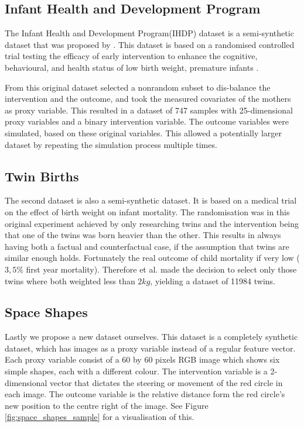 \documentclass{report}
\begin{document}
\subsection{Infant Health and Development Program}
The Infant Health and Development Program(IHDP) dataset is a semi-synthetic dataset that was proposed by \cite{hill2011bayesian}. This dataset is based on a randomised controlled trial testing the efficacy of early intervention to enhance the cognitive, behavioural, and health status of low birth weight, premature infants \cite{ramey1992infant}. 

From this original dataset \cite{hill2011bayesian} selected a nonrandom subset to dis-balance the intervention and the outcome, and took the measured covariates of the mothers as proxy variable. This resulted in a dataset of 747 samples with 25-dimensional proxy variables and a binary intervention variable. The outcome variables were simulated, based on these original variables. This allowed a potentially larger dataset by repeating the simulation process multiple times.

\subsection{Twin Births}
The second dataset is also a semi-synthetic dataset. It is based on a medical trial on the effect of birth weight on infant mortality\cite{almond2005costs}. The randomisation was in this original experiment achieved by only researching twins and the intervention being that one of the twins was born heavier than the other. This results in always having both a factual and counterfactual case, if the assumption that twins are similar enough holds. Fortunately the real outcome of child mortality if very low ($3,5\%$ first year mortality). Therefore \cite{louizos2017causal} et al. made the decision to select only those twins where both weighted less than $2kg$, yielding a dataset of 11984 twins.

\subsection{Space Shapes}
Lastly we propose a new dataset ourselves. This dataset is a completely synthetic dataset, which has images as a proxy variable instead of a regular feature vector. Each proxy variable consist of a 60 by 60 pixels RGB image which shows six simple shapes, each with a different colour. The intervention variable is a 2-dimensional vector that dictates the steering or movement of the red circle in each image. The outcome variable is the relative distance form the red circle's new position to the centre right of the image. See Figure \ref{fig:space_shapes_sample} for a visualisation of this. 
\end{document}
